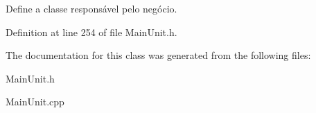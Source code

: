 Define a classe responsável pelo negócio. 



Definition at line 254 of file Main\-Unit.\-h.



The documentation for this class was generated from the following files\-:\begin{DoxyCompactItemize}
\item 
Main\-Unit.\-h\item 
Main\-Unit.\-cpp\end{DoxyCompactItemize}
